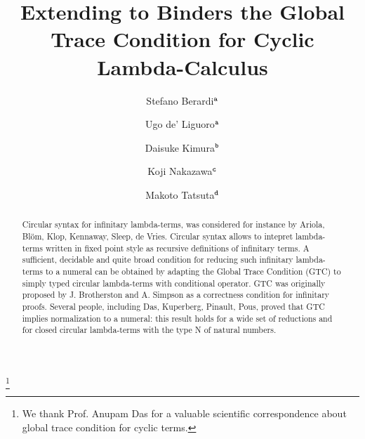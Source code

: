 \documentclass[twoside,11pt]{entics}
\begin{document}
\begin{frontmatter}
  \title{Extending to Binders the Global Trace Condition for Cyclic Lambda-Calculus} 
 \thanks[ALL]{We thank Prof. Anupam Das for a valuable scientific correspondence about 
 global trace condition for cyclic terms.}   %
  \author{Stefano Berardi$^{\tt a}$}	%
   \author{Ugo de' Liguoro$^{\tt a}$}		%
    \author{Daisuke Kimura$^{\tt b}$}
      \author{Koji Nakazawa$^{\tt c}$}
       \author{Makoto Tatsuta$^{\tt d}$}
   \address[a]{Computer Science Department, Turin University, Torino, Italy}  							
   \address[b]{Department of Information Science, Toho University, Japan} 
   \address[c]{Graduate School of Informatics, Nagoya University, Japan}
   \address[d]{National Institute of Informatics/Sokendai, Tokyo, Japan}
 
 

\begin{abstract} 
Circular syntax for infinitary lambda-terms,
was considered for instance by Ariola, Bl\"{o}m, Klop, Kennaway, Sleep, de Vries.
Circular syntax allows to intepret lambda-terms written in fixed point style 
as recursive definitions of infinitary terms. 
A sufficient, decidable and quite broad condition for reducing such 
infinitary lambda-terms to a numeral can be obtained
by adapting the Global Trace Condition (GTC) to simply typed 
circular lambda-terms with conditional operator. 
GTC was originally proposed by J. Brotherston and A. Simpson
as a correctness condition for infinitary proofs.
Several people, including Das, Kuperberg, Pinault, Pous,
proved that GTC implies normalization to a numeral:
this result holds for a wide set of reductions and for closed circular lambda-terms 
with the type N of natural numbers. 


\end{abstract}
\end{frontmatter}
\end{document}
